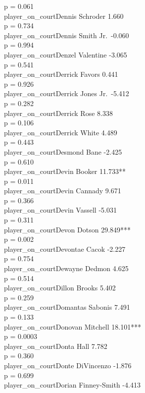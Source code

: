\documentclass[
  landscape]{article}
\begin{document}
p = 0.061\\
player\_on\_courtDennis Schroder 1.660\\
p = 0.734\\
player\_on\_courtDennis Smith Jr.~-0.060\\
p = 0.994\\
player\_on\_courtDenzel Valentine -3.065\\
p = 0.541\\
player\_on\_courtDerrick Favors 0.441\\
p = 0.926\\
player\_on\_courtDerrick Jones Jr.~-5.412\\
p = 0.282\\
player\_on\_courtDerrick Rose 8.338\\
p = 0.106\\
player\_on\_courtDerrick White 4.489\\
p = 0.443\\
player\_on\_courtDesmond Bane -2.425\\
p = 0.610\\
player\_on\_courtDevin Booker 11.733**\\
p = 0.011\\
player\_on\_courtDevin Cannady 9.671\\
p = 0.366\\
player\_on\_courtDevin Vassell -5.031\\
p = 0.311\\
player\_on\_courtDevon Dotson 29.849***\\
p = 0.002\\
player\_on\_courtDevontae Cacok -2.227\\
p = 0.754\\
player\_on\_courtDewayne Dedmon 4.625\\
p = 0.514\\
player\_on\_courtDillon Brooks 5.402\\
p = 0.259\\
player\_on\_courtDomantas Sabonis 7.491\\
p = 0.133\\
player\_on\_courtDonovan Mitchell 18.101***\\
p = 0.0003\\
player\_on\_courtDonta Hall 7.782\\
p = 0.360\\
player\_on\_courtDonte DiVincenzo -1.876\\
p = 0.699\\
player\_on\_courtDorian Finney-Smith -4.413\\
\end{document}
